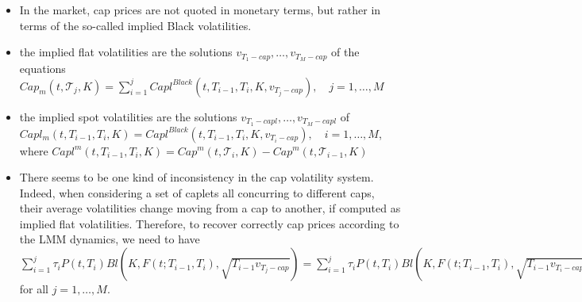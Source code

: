 \documentclass{beamer}
\begin{document}
\begin{frame}
\begin{itemize}
	\item In the market, cap prices are not quoted in monetary terms, but rather in terms of the so-called implied Black volatilities. 
%
	\item the implied flat volatilities are the solutions $v_{T_1-cap},\ldots, v_{T_M-cap}$ of the equations
	$Cap_m(t, \mathcal{T}_j, K) = \sum_{i=1}^j Capl^{Black}(t, T_{i-1}, T_i,K,v_{T_j-cap}),\quad j=1, \ldots,M$
	\item the implied spot volatilities are the solutions $v_{T_1-capl},\ldots, v_{T_M-capl}$ of
	$Capl_m(t, T_{i-1},T_i,K) = Capl^{Black}(t, T_{i-1}, T_i,K,v_{T_i-cap}),\quad i=1, \ldots,M$, 
	where $Capl^m(t, T_{i-1}, T_i, K) = Cap^m(t, \mathcal{T}_i,K)-Cap^m(t, \mathcal{T}_{i-1},K)$

%
	\item There seems to be one kind of inconsistency in the cap volatility system. Indeed, when considering a set of caplets all concurring to different caps, their average volatilities change moving from a cap to another, if computed as implied flat volatilities. Therefore, to recover correctly cap prices according to the LMM dynamics, we need to have
	$\sum_{i=1}^j\tau_iP(t,T_i)Bl(K,F(t;T_{i-1},T_i),\sqrt{T_{i-1}v_{T_j-cap}}) = \sum_{i=1}^j\tau_iP(t,T_i)Bl(K,F(t;T_{i-1},T_i),\sqrt{T_{i-1}v_{T_i-capl}})$ for all $j = 1,\dots, M$.
\end{itemize}
\end{frame}	
\end{document}

